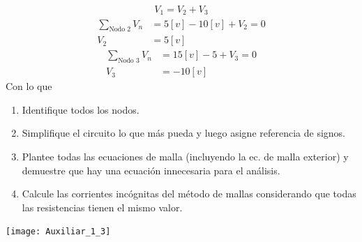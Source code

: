 \documentclass[
  11pt,
  letterpaper,
   addpoints,
   answers
  ]{exam}
\begin{document}
\begin{questions}
\begin{solution}
\begin{enumerate}
\begin{align}
        V_{1} = V_{2} + V_{3}
    \end{align}
    \begin{align}
        \sum_{\text{Nodo 2}} V_{n} &= 5[v] - 10[v] + V_{2} = 0\\
        V_{2} &= 5[v]
    \end{align}
    \begin{align}
        \sum_{\text{Nodo 3}} V_{n} &= 15[v] - 5 + V_{3} = 0\\
        V_{3} &= -10[v]
    \end{align}
    Con lo que
    \end{enumerate}

\end{solution}
\question \begin{enumerate}
    \item Identifique todos los nodos.
    \item Simplifique el circuito lo que más pueda y luego asigne referencia de signos.
    \item Plantee todas las ecuaciones de malla (incluyendo la ec. de malla exterior) y demuestre que hay una ecuación innecesaria para el análisis.
    \item Calcule las corrientes incógnitas del método de mallas considerando que todas las resistencias tienen el mismo valor.
\end{enumerate}
\begin{center}
    \texttt{[image: Auxiliar\_1\_3]}
\end{center}
\end{questions}
\newpage
\end{document}

